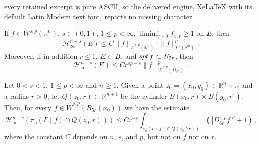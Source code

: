 \documentclass[10pt,a4paper]{amsart}
\newcommand{\R}{\mathbb R}
\newcommand{\spt}{{\rm spt}\,}
\renewcommand{\H}{\mathcal{H}}
\begin{document}
every retained excerpt is pure ASCII, so the delivered engine, XeLaTeX with its default Latin Modern text font, reports no missing character.
\begin{corollary}\label{c:capacity-estimate}
If $f\in W^{s,p}(\R^n)$, $s\in(0,1)$, $1\le p<\infty$, $\liminf_{r\downarrow0}f_{x,r}\ge 1$ on $E$, then
\begin{equation}\label{e:capacity-estimate-3}
\H^{n-s}_\infty(E)\le C\|f\|_{\dot{W}^{s,p}(\R^n)}\cdot\|f\|_{L^p(\R^n)}^{p-1}\, .
\end{equation}
Moreover, if in addition $r\leq 1$, $E\subset B_r$ and $\spt f\subset B_{2r}$, then
\begin{equation}\label{e:capacity-estimate-4}
\H^{n-s}_\infty(E)\le Cr^{sp-s}\|f\|_{\dot{W}^{s,p}(B_{3r})}^p\, .
\end{equation}
\end{corollary}

\begin{lemma}\label{l:cylinder-estimate}
Let $0<s<1$, $1\leq p < \infty$ and $n\geq 1$. Given a point $z_0 = (x_0, y_0) \in \mathbb R^n\times \mathbb R$ and a radius $r>0$, let $Q(z_0,r)\subset \mathbb R^{n+1}$ be the cylinder $B(x_0,r)\times B(y_0,r^s)$. 
Then, for every $f\in \dot{W}^{s,p} (B_{5r} (x_0))$ we have the estimate
\[
\H^{n-s}_{\infty}(\pi_o (\Gamma (f)\cap Q(z_0,r)))\le Cr^{-s}\int_{\pi_o (\Gamma (f) \cap Q(z_0,2r))} (|D^{s,p}_{6r} f|^p+1)\, ,
\]
where the constant $C$ depends on $n$, $s$, and $p$, but not on $f$ nor on $r$.
\end{lemma}
\end{document}
